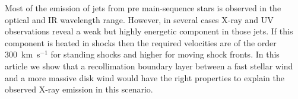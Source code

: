Most of the emission of jets from pre main-sequence stars is observed in the optical and IR wavelength range. However, in several cases X-ray and UV observations reveal a weak but highly energetic component in those jets. If this component is heated in shocks then the required velocities are of the order 300~km~s$^{-1}$ for standing shocks and higher for moving shock fronts. In this article we show that a recollimation boundary layer between a fast stellar wind and a more massive disk wind would have the right properties to explain the observed X-ray emission in this scenario.
